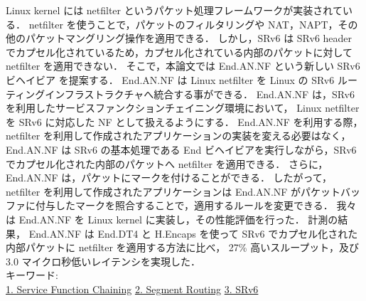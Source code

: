 Linux kernel には netfilter というパケット処理フレームワークが実装されている．
netfilter を使うことで，パケットのフィルタリングや NAT，NAPT，その他のパケットマングリング操作を適用できる．
しかし，SRv6 は SRv6 header でカプセル化されているため，カプセル化されている内部のパケットに対して netfilter を適用できない．
そこで，本論文では End.AN.NF という新しい SRv6 ビヘイビア を提案する．
End.AN.NF は Linux netfilter を Linux の SRv6 ルーティングインフラストラクチャへ統合する事ができる．
End.AN.NF は，SRv6 を利用したサービスファンクションチェイニング環境において，
Linux netfilter を SRv6 に対応した NF として扱えるようにする．
End.AN.NF を利用する際，netfilter を利用して作成されたアプリケーションの実装を変える必要はなく，
End.AN.NF は SRv6 の基本処理である End ビヘイビアを実行しながら，SRv6 でカプセル化された内部のパケットへ netfilter を適用できる．
さらに，End.AN.NF は，パケットにマークを付けることができる．
したがって，netfilter を利用して作成されたアプリケーションは End.AN.NF がパケットバッファに付与したマークを照合することで，適用するルールを変更できる．
我々は End.AN.NF を Linux kernel に実装し，その性能評価を行った．
計測の結果， End.AN.NF は End.DT4 と H.Encaps を使って SRv6 でカプセル化された内部パケットに netfilter を適用する方法に比べ，
27\% 高いスループット，及び 3.0 マイクロ秒低いレイテンシを実現した．
~ \\
キーワード:\\
\underline{1. Service Function Chaining}
\underline{2. Segment Routing}
\underline{3. SRv6}
\begin{flushright}
\dept \\
\author
\end{flushright}
